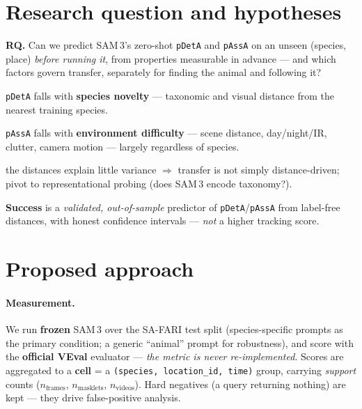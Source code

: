 \documentclass[11pt]{article}
\begin{document}
\section{Research question and hypotheses}
\noindent\textbf{RQ.} Can we predict SAM\,3's zero-shot \texttt{pDetA} and \texttt{pAssA} on an unseen
(species, place) \emph{before running it}, from properties measurable in advance --- and which factors
govern transfer, separately for finding the animal and following it?
\begin{description}[leftmargin=2.6em,style=nextline]
  \item[H1 (detection)] \texttt{pDetA} falls with \textbf{species novelty} --- taxonomic and visual
    distance from the nearest training species.
  \item[H2 (association)] \texttt{pAssA} falls with \textbf{environment difficulty} --- scene distance,
    day/night/IR, clutter, camera motion --- largely regardless of species.
  \item[H0 (null, still a result)] the distances explain little variance $\Rightarrow$ transfer is not
    simply distance-driven; pivot to representational probing (does SAM\,3 encode taxonomy?).
\end{description}
\noindent\textbf{Success} is a \emph{validated, out-of-sample} predictor of \texttt{pDetA}/\texttt{pAssA}
from label-free distances, with honest confidence intervals --- \emph{not} a higher tracking score.

\section{Proposed approach}
\paragraph{Measurement.} We run \textbf{frozen} SAM\,3 over the SA-FARI test split (species-specific
prompts as the primary condition; a generic ``animal'' prompt for robustness), and score with the
\textbf{official VEval} evaluator --- \emph{the metric is never re-implemented}. Scores are aggregated
to a \textbf{cell} = a \texttt{(species, location\_id, time)} group, carrying \emph{support} counts
($n_\text{frames}$, $n_\text{masklets}$, $n_\text{videos}$). Hard negatives (a query returning nothing)
are kept --- they drive false-positive analysis.
\end{document}
